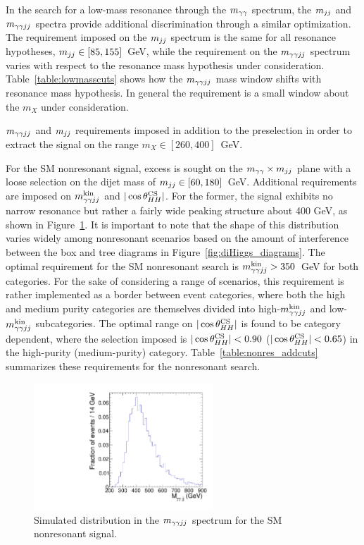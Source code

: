 In the search for a low-mass resonance through the $m_{\gamma\gamma}$ spectrum, the $m_{jj}$ and $m_{\gamma\gamma jj}$ spectra
provide additional discrimination through a similar optimization. The requirement imposed
on the $m_{jj}$ spectrum is the same for all resonance hypotheses, $m_{jj} \in [85,155]$~GeV, while the
requirement on the $m_{\gamma\gamma jj}$ spectrum varies with respect to the resonance mass hypothesis
under consideration.
Table~\ref{table:lowmasscuts} shows how the $m_{\gamma\gamma jj}$ mass window shifts with resonance mass hypothesis.
In general the requirement is a small window about the $m_X$ under consideration.

\begin{table}[ht]
  \centering
  \renewcommand{\arraystretch}{1.4}
  \caption{$m_{\gamma\gamma jj}$ and $m_{jj}$ requirements imposed in addition to the preselection in order to extract
the signal on the range $m_X \in [260, 400]$~GeV.}
  
  \label{table:lowmasscuts}
\end{table}

For the SM nonresonant signal, excess is sought on the $m_{\gamma\gamma} \times m_{jj}$ plane with a
loose selection on the dijet mass of $m_{jj} \in [60, 180]$~GeV.
Additional requirements are imposed on $m_{\gamma\gamma jj}^{\rm kin}$ and $|\cos {\theta^{\rm CS}_{HH}}|$. For the former, the signal
exhibits no narrow resonance but rather a fairly wide peaking structure about 400 GeV, as shown in
Figure~\ref{fig:ggHH_4body}. It is important
to note that the shape of this distribution varies widely among nonresonant scenarios based on
the amount of interference between the box and tree diagrams in Figure~\ref{fig:diHiggs_diagrams}.
The optimal requirement for the SM nonresonant search is $m_{\gamma\gamma jj}^{\rm kin} > 350$~GeV for both categories.
For the sake of considering a range of scenarios, this requirement is rather implemented as a border
between event categories, where both the high and medium purity categories are themselves divided into
high-$m_{\gamma\gamma jj}^{\rm kin}$ and low-$m_{\gamma\gamma jj}^{\rm kin}$ subcategories.
The optimal range on $|\cos {\theta^{\rm CS}_{HH}}|$ is found to be category dependent, where the selection imposed
is $|\cos {\theta^{\rm CS}_{HH}}| < 0.90$ ($|\cos {\theta^{\rm CS}_{HH}}| < 0.65$) in the high-purity (medium-purity) category.
Table~\ref{table:nonres_addcuts} summarizes these requirements for the nonresonant search.

\begin{figure}[ht]
 \begin{center}
   \includegraphics[width=0.6\textwidth]{figures/selection/ggHH_4body.pdf}
 \end{center}
\caption{Simulated distribution in the $m_{\gamma\gamma jj}$ spectrum for the SM nonresonant signal.}
\label{fig:ggHH_4body}
\end{figure}


